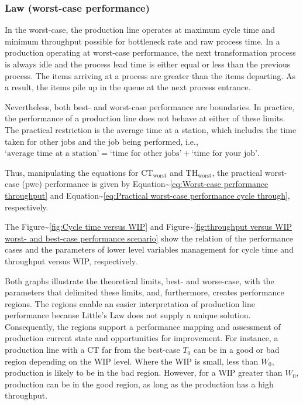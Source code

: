 \documentclass{article}
\begin{document}
\subsubsection{Law (worst-case performance)}
\label{sec:orgfbc9f3b}

In the worst-case, the production line operates at maximum cycle time and minimum throughput possible for bottleneck rate and raw process time.
In a production operating at worst-case performance, the next transformation process is always idle and the process lead time is either equal or less than the previous process.
The items arriving at a process are greater than the items departing.
As a result, the items pile up in the queue at the next process entrance.

Nevertheless, both best- and worst-case performance are boundaries.
In practice, the performance of a production line does not behave at either of these limits.
The practical restriction is the average time at a station, which includes the time taken for other jobs and the job being performed, i.e., \(\mbox{`average time at a station'} = \mbox{`time for other jobs'} + \mbox{`time for your job'}\).

Thus, manipulating the equations for \(\mbox{CT}_{\mbox{worst}}\) and \(\mbox{TH}_{\mbox{worst}}\), the practical worst-case (pwc) performance is given by Equation\textasciitilde{}\ref{eq:Worst-case performance throughput} and Equation\textasciitilde{}\ref{eq:Practical worst-case performance cycle through}, respectively.

The Figure\textasciitilde{}\ref{fig:Cycle time versus WIP} and Figure\textasciitilde{}\ref{fig:throughput versus WIP worst- and best-case performance scenario} show the relation of the performance cases and the parameters of lower level variables management for cycle time and throughput versus WIP, respectively.

Both graphs illustrate the theoretical limits, best- and worse-case, with the parameters that delimited these limits, and, furthermore, creates performance regions.
The regions enable an easier interpretation of production line performance because Little's Law does not supply a unique solution.
Consequently, the regions support a performance mapping and assessment of production current state and opportunities for improvement.
For instance, a production line with a CT far from the best-case \(T_0\) can be in a good or bad region depending on the WIP level.
Where the WIP is small, less than \(W_0\), production is likely to be in the bad region.
However, for a WIP greater than \(W_0\), production can be in the good region, as long as the production has a high throughput.
\end{document}
